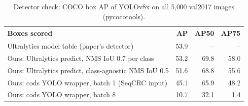 \begin{table}[h]
\centering\footnotesize
\caption{Detector check: COCO box AP of YOLOv8x on all 5{,}000 val2017 images (pycocotools).}
\label{tab:det}
\begin{tabular}{@{}lrrr@{}}
\toprule
Boxes scored & AP & AP50 & AP75 \\
\midrule
Ultralytics model table (paper's detector) & 53.9 & -- & -- \\
Ours: Ultralytics predict, NMS IoU 0.7 per class & 53.2 & 69.8 & 58.0 \\
Ours: Ultralytics predict, class-agnostic NMS IoU 0.5 & 51.6 & 68.8 & 55.6 \\
Ours: cods YOLO wrapper, batch 1 (SeqCRC input) & 45.1 & 65.9 & 48.2 \\
Ours: cods YOLO wrapper, batch 8 & 10.7 & 32.1 & 1.4 \\
\bottomrule
\end{tabular}
\end{table}

